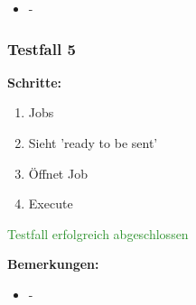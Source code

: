 \begin{itemize}[noitemsep,nolistsep]
    \item -
\end{itemize}

\subsubsection*{Testfall 5}

\textbf{Schritte:}

\begin{enumerate}
    \item Jobs
    \item Sieht 'ready to be sent'
    \item Öffnet Job
    \item Execute
\end{enumerate}

\textcolor{ForestGreen}{Testfall erfolgreich abgeschlossen}

\bigskip
\textbf{Bemerkungen:}

\begin{itemize}[noitemsep,nolistsep]
    \item -
\end{itemize}